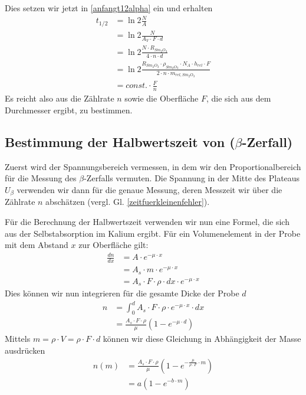 Dies setzen wir jetzt in \ref{anfangt12alpha} ein und erhalten
\begin{align}
 t_{1/2} & = \ln 2 \frac{N}{A} \\
         & = \ln 2 \frac{N}{A_V \cdot F \cdot d} \\
         & = \ln 2 \frac{N \cdot R_{Sm_2O_3}}{4 \cdot n \cdot d} \\
         & = \ln 2 \frac{R_{Sm_2O_3} \cdot \rho_{Sm_2O_3} \cdot N_A \cdot h_{rel} \cdot F }{2 \cdot n \cdot m_{rel,Sm_2O_3}} \\
         & = const. \cdot \frac{F}{n}
\end{align}
Es reicht also aus die Zählrate $n$ sowie die Oberfläche $F$, die sich aus dem Durchmesser ergibt, zu bestimmen.


\subsection{Bestimmung der Halbwertszeit von  ($\beta$-Zerfall)}
Zuerst wird der Spannungsbereich vermessen, in dem wir den Proportionalbereich für die Messung des $\beta$-Zerfalls vermuten. Die Spannung in der Mitte des Plateaus $U_{\beta}$ verwenden wir dann für die genaue Messung, deren Messzeit wir über die Zählrate $n$ abschätzen (vergl. Gl. \ref{zeitfuerkleinenfehler}).

Für die Berechnung der Halbwertszeit verwenden wir nun eine Formel, die sich aus der Selbstabsorption im Kalium ergibt. Für ein Volumenelement in der Probe mit dem Abstand $x$ zur Oberfläche gilt:
\begin{align}
 \frac{dn}{dx} & = A \cdot e^{- \mu \cdot x} \\
               &  = A_s \cdot m \cdot  e^{- \mu \cdot x} \\
               &  = A_s \cdot F \cdot \rho \cdot dx \cdot  e^{- \mu \cdot x}
\end{align}
Dies können wir nun integrieren für die gesamte Dicke der Probe $d$
\begin{align}
 n & = \int_0^d A_s \cdot F \cdot \rho \cdot e^{-\mu \cdot x} \cdot dx \\
   & = \frac{A_s \cdot F \cdot \rho}{\mu} \left( 1 - e^{-\mu \cdot d} \right)
\end{align}
Mittels $m = \rho \cdot V = \rho \cdot F \cdot d$ können wir diese Gleichung in Abhängigkeit der Masse ausdrücken
\begin{align}
 n \left( m \right) & = \frac{A_s \cdot F \cdot \rho}{\mu} \left( 1 - e^{- \frac{\mu}{\rho \cdot F} \cdot m} \right) \\
		    & = a \left( 1 - e^{- b \cdot m} \right) \label{betafitfunktion}
\end{align}

